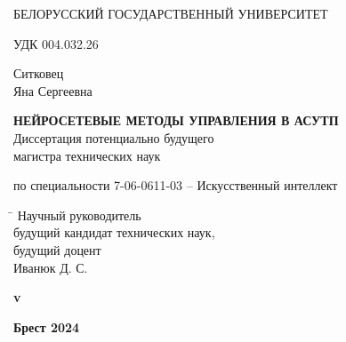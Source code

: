 \begin{titlepage}

    \begin{center} \bfseries
        \bigskip
        \medskip

        {БЕЛОРУССКИЙ ГОСУДАРСТВЕННЫЙ УНИВЕРСИТЕТ}
    \end{center}
    \vspace{1cm}

    \noindent УДК 004.032.26 \\
    \vspace{1cm}

    \begin{center}
        {Ситковец \\ Яна Сергеевна}\\
        \vspace{1cm}

        {\bfseries НЕЙРОСЕТЕВЫЕ МЕТОДЫ УПРАВЛЕНИЯ В АСУТП}\\
        \vspace{2cm}
        Диссертация потенциально будущего\\
        магистра технических наук\\
        \bigskip

        по специальности 7-06-0611-03 -- Искусственный интеллект
    \end{center}
    \vspace{3cm}

    \begin{tabbing}
        \hspace{8cm} \= \kill \>
        Научный руководитель \+ \\
        будущий кандидат технических наук, \\будущий доцент\\
        Иванюк Д. С.
    \end{tabbing}


    \ifdefined\dissertationversion
        \vspace{3cm}
        \begin{center}
            \bfseries v\dissertationversion
        \end{center}
        \vspace{3cm}
    \else
        \vspace{7cm}
    \fi

    \begin{center}
        \bfseries Брест 2024
    \end{center}

\end{titlepage}